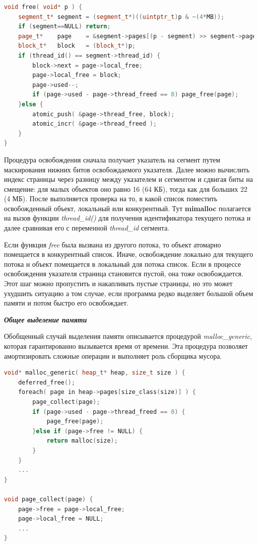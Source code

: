 \begin{lstlisting}[language=c++,numbers=none]
void free( void* p ) {
	segment_t* segment = (segment_t*)((uintptr_t)p & ~(4*MB));
	if (segment==NULL) return;
	page_t*    page    = &segment->pages[(p - segment) >> segment->page_shift];
	block_t*   block   = (block_t*)p;
	if (thread_id() == segment->thread_id) {
		block->next = page->local_free;
		page->local_free = block;
		page->used--;
		if (page->used - page->thread_freed == 0) page_free(page);
	}else {
		atomic_push( &page->thread_free, block);
		atomic_incr( &page->thread_freed );
	}
}
\end{lstlisting}

Процедура освобождения сначала получает указатель на сегмент путем маскирования нижних битов освобождаемого указателя. Далее можно вычислить индекс страницы через разницу между указателем и сегментом и сдвигая биты на смещение: для малых объектов оно равно 16 (64 КБ), тогда как для больших 22 (4 МБ). После выполняется проверка на то, в какой список поместить освобожденный объект, локальный или конкурентный. Тут \textbf{mimalloc} полагается на вызов функции \textit{thread\_id()} для получения идентификатора текущего потока и далее сравнивая его с переменной \textit{thread\_id} сегмента.

Если функция \textit{free} была вызвана из другого потока, то объект атомарно помещается в конкурентный список. Иначе, освобождение локально для текущего потока и объект помещается в локальный для потока список. Если в процессе освобождения указателя страница становится пустой, она тоже освобождается. Этот шаг можно пропустить и накапливать пустые страницы, но это может ухудшить ситуацию а том случае, если программа редко выделяет большой объем памяти и потом быстро его освобождает.

\bigbreak
\textit{\textbf{Общее выделение памяти}}

Обобщенный случай выделения памяти описывается процедурой \textit{malloc\_generic}, которая гарантированно вызывается время от времени. Эта процедура позволяет амортизировать сложные операции и выполняет роль сборщика мусора.

\begin{lstlisting}[language=c++,numbers=none]
void* malloc_generic( heap_t* heap, size_t size ) {
	deferred_free();
	foreach( page in heap->pages[size_class(size)] ) {
		page_collect(page);
		if (page->used - page->thread_freed == 0) {
			page_free(page);
		}else if (page->free != NULL) {
			return malloc(size);
		}
	}
	...
}

void page_collect(page) {
	page->free = page->local_free;
	page->local_free = NULL;
	...
}
\end{lstlisting}

